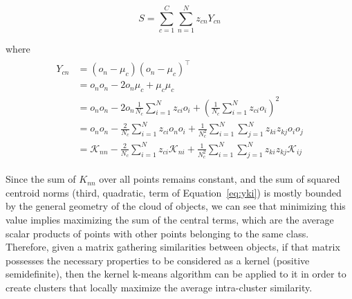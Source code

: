 \documentclass[10pt,journal,compsoc]{IEEEtran}
\begin{document}
\[
S = \sum_{c=1}^{C} \sum_{n=1}^{N} z_{cn} Y_{cn}
\]

where
\begin{align}
\begin{split}
Y_{cn} & =  \left(o_n-\mu_c\right)\left(o_n-\mu_c\right)^\top \\
       & =  o_no_n - 2 o_n\mu_c + \mu_c\mu_c \\
       & =  o_no_n - 2 o_n\frac{1}{N_c} \sum_{i=1}^{N} z_{ci} o_i +
       	 \left(\frac{1}{N_c} \sum_{i=1}^{N} z_{ci} o_i\right)^2 \\ %
       & =  o_no_n - \frac{2}{N_c} \sum_{i=1}^{N} z_{ci} o_no_i +
       	 \frac{1}{N_c^2} \sum_{i=1}^{N} \sum_{j=1}^{N} z_{ki} z_{kj} o_io_j \\
       & =  \mathcal{K}_{nn} - \frac{2}{N_c} \sum_{i=1}^{N} z_{ci} \mathcal{K}_{ni} +
         \frac{1}{N_c^2} \sum_{i=1}^{N} \sum_{j=1}^{N} z_{ki} z_{kj} \mathcal{K}_{ij} \label{eq:yki}
\end{split}
\end{align}



Since the sum of $K_{nn}$ over all points remains constant, and the sum of squared centroid norms (third, quadratic, term of Equation~\ref{eq:yki}) is mostly bounded by the general geometry of the cloud of objects, we can see that minimizing this value implies maximizing the sum of the central terms, which are the average scalar products of points with other points belonging to the same class. Therefore, given a matrix gathering similarities between objects, if that matrix possesses the necessary properties to be considered as a kernel (positive semidefinite), then the kernel k-means algorithm can be applied to it in order to create clusters that locally maximize the average intra-cluster similarity.
\end{document}
